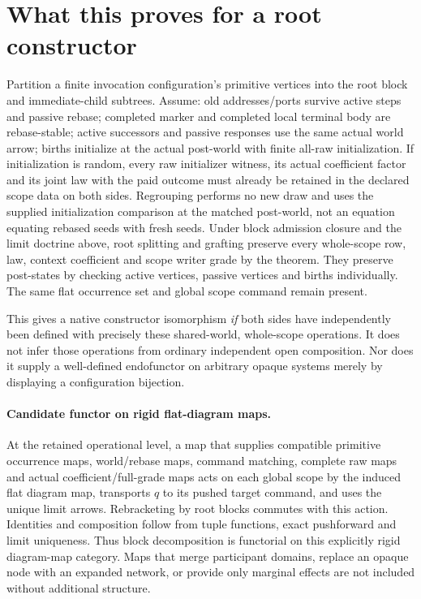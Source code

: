 \documentclass[11pt]{article}
\begin{document}
\section{What this proves for a root constructor}
Partition a finite invocation configuration's primitive vertices into the root block and immediate-child subtrees. Assume: old addresses/ports survive active steps and passive rebase; completed marker and completed local terminal body are rebase-stable; active successors and passive responses use the same actual world arrow; births initialize at the actual post-world with finite all-raw initialization. If initialization is random, every raw initializer witness, its actual coefficient factor and its joint law with the paid outcome must already be retained in the declared scope data on both sides. Regrouping performs no new draw and uses the supplied initialization comparison at the matched post-world, not an equation equating rebased seeds with fresh seeds. Under block admission closure and the limit doctrine above, root splitting and grafting preserve every whole-scope row, law, context coefficient and scope writer grade by the theorem. They preserve post-states by checking active vertices, passive vertices and births individually. The same flat occurrence set and global scope command remain present.

This gives a native constructor isomorphism \emph{if} both sides have independently been defined with precisely these shared-world, whole-scope operations. It does not infer those operations from ordinary independent open composition. Nor does it supply a well-defined endofunctor on arbitrary opaque systems merely by displaying a configuration bijection.

\paragraph{Candidate functor on rigid flat-diagram maps.}
At the retained operational level, a map that supplies compatible primitive occurrence maps, world/rebase maps, command matching, complete raw maps and actual coefficient/full-grade maps acts on each global scope by the induced flat diagram map, transports $q$ to its pushed target command, and uses the unique limit arrows. Rebracketing by root blocks commutes with this action. Identities and composition follow from tuple functions, exact pushforward and limit uniqueness. Thus block decomposition is functorial on this explicitly rigid diagram-map category. Maps that merge participant domains, replace an opaque node with an expanded network, or provide only marginal effects are not included without additional structure.
\end{document}
